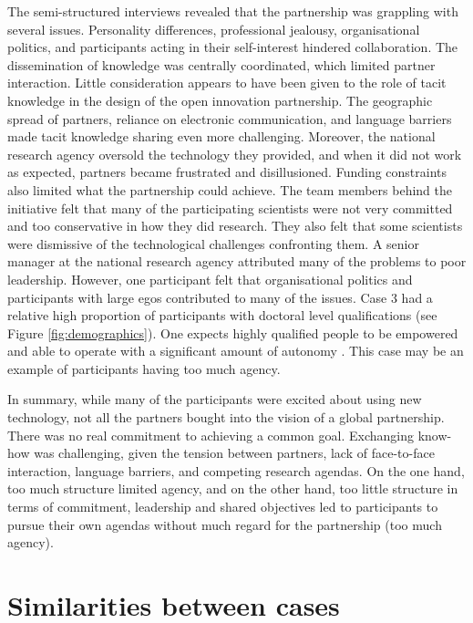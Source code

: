 The semi-structured interviews revealed that the partnership was grappling with several issues. Personality differences, professional jealousy, organisational politics, and participants acting in their self-interest hindered collaboration. The dissemination of knowledge was centrally coordinated, which limited partner interaction. Little consideration appears to have been given to the role of tacit knowledge in the design of the open innovation partnership. The geographic spread of partners, reliance on electronic communication, and language barriers made tacit knowledge sharing even more challenging. Moreover, the national research agency oversold the technology they provided, and when it did not work as expected, partners became frustrated and disillusioned. Funding constraints also limited what the partnership could achieve. The team members behind the initiative felt that many of the participating scientists were not very committed and too conservative in how they did research. They also felt that some scientists were dismissive of the technological challenges confronting them. A senior manager at the national research agency attributed many of the problems to poor leadership. However, one participant felt that organisational politics and participants with large egos contributed to many of the issues. Case 3 had a relative high proportion of participants with doctoral level qualifications (see Figure \ref{fig:demographics}). One expects highly qualified people to be empowered and able to operate with a significant amount of autonomy \citep{goller2017human}. This case may be an example of participants having too much agency. \medskip

In summary, while many of the participants were excited about using new technology, not all the partners bought into the vision of a global partnership. There was no real commitment to achieving a common goal. Exchanging know-how was challenging, given the tension between partners, lack of face-to-face interaction, language barriers, and competing research agendas. On the one hand, too much structure limited agency, and on the other hand, too little structure in terms of commitment, leadership and shared objectives led to participants to pursue their own agendas without much regard for the partnership (too much agency).

\section{Similarities between cases}

